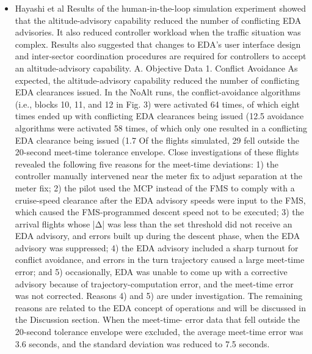 \documentclass{aer1315-pretty}
\begin{document}
\begin{itemize}
\item Hayashi et al \cite{Hayashi:2011} 
Results of the human-in-the-loop simulation experiment showed that the altitude-advisory capability reduced the number of conflicting EDA advisories. It also reduced controller workload when the traffic situation was complex. Results also suggested that changes to EDA’s user interface design and inter-sector coordination procedures are required for controllers to accept an altitude-advisory capability.
A. Objective Data
1. Conflict Avoidance
    As expected, the altitude-advisory capability reduced the number of conflicting EDA clearances issued. In the
NoAlt runs, the conflict-avoidance algorithms (i.e., blocks 10, 11, and 12 in Fig. 3) were activated 64 times, of
which eight times ended up with conflicting EDA clearances being issued (12.5%
avoidance algorithms were activated 58 times, of which only one resulted in a conflicting EDA clearance being
issued (1.7%
    Of the flights simulated, 29 fell outside the 20-second meet-time tolerance envelope. Close investigations of
these flights revealed the following five reasons for the meet-time deviations: 1) the controller manually intervened
near the meter fix to adjust separation at the meter fix; 2) the pilot used the MCP instead of the FMS to comply with
a cruise-speed clearance after the EDA advisory speeds were input to the FMS, which caused the FMS-programmed
descent speed not to be executed; 3) the arrival flights whose |Δ| was less than the set threshold did not receive an
EDA advisory, and errors built up during the descent phase, when the EDA advisory was suppressed; 4) the EDA
advisory included a sharp turnout for conflict avoidance, and errors in the turn trajectory caused a large meet-time
error; and 5) occasionally, EDA was unable to come up with a corrective advisory because of trajectory-computation
error, and the meet-time error was not corrected. Reasons 4) and 5) are under investigation. The remaining reasons
are related to the EDA concept of operations and will be discussed in the Discussion section. When the meet-time-
error data that fell outside the 20-second tolerance envelope were excluded, the average meet-time error was 3.6
seconds, and the standard deviation was reduced to 7.5 seconds.



\end{itemize}
\end{document}
